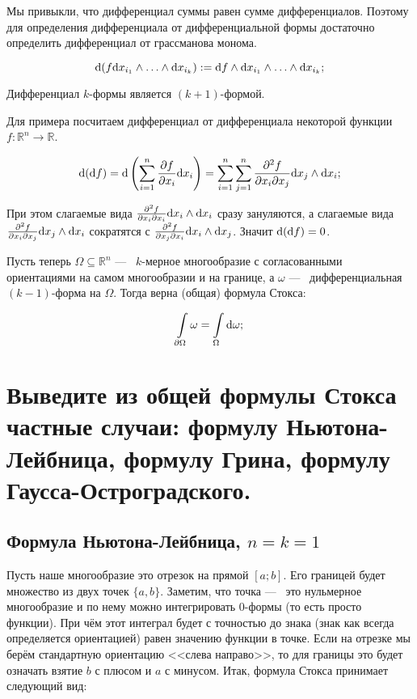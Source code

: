 \documentclass{article}
\begin{document}
	Мы привыкли, что дифференциал суммы равен сумме дифференциалов. Поэтому для определения дифференциала от дифференциальной формы достаточно определить дифференциал от грассманова монома.

	\[ \mathrm{d}(f \mathrm{d} x_{i_1} \land \ldots \land \mathrm{d} x_{i_k}) := \mathrm{d} f \land \mathrm{d} x_{i_1} \land \ldots \land \mathrm{d} x_{i_k}; \]

	\begin{remark}
		Дифференциал $k$-формы является $(k + 1)$-формой.
	\end{remark}

	Для примера посчитаем дифференциал от дифференциала некоторой функции $f:\mathbb{R}^n \to \mathbb{R}$.

	\[\mathrm{d} (\mathrm{d} f) = \mathrm{d} \left(\sum_{i = 1}^n \frac{\partial f}{\partial x_i}\mathrm{d} x_i \right) = \sum_{i = 1}^n \sum_{j = 1}^n \frac{\partial^2 f}{\partial x_i \partial x_j} \mathrm{d} x_j \land \mathrm{d} x_i; \]

	При этом слагаемые вида $\frac{\partial^2 f}{\partial x_i \partial x_i} \mathrm{d} x_i \land \mathrm{d} x_i$ сразу зануляются, а слагаемые вида $\frac{\partial^2 f}{\partial x_i \partial x_j} \mathrm{d} x_j \land \mathrm{d} x_i$ сократятся с $\frac{\partial^2 f}{\partial x_j \partial x_i} \mathrm{d} x_i \land \mathrm{d} x_j$. Значит $\mathrm{d}(\mathrm{d} f) = 0$.

	Пусть теперь $\Omega \subseteq \mathbb{R}^n$ ---~ $k$-мерное многообразие с согласованными ориентациями на самом многообразии и на границе, а $\omega$ ---~ дифференциальная $(k - 1)$-форма на $\Omega$. Тогда верна (общая) формула Стокса:

	\[ \int\limits_{\partial \Omega} \omega = \int\limits_\Omega \mathrm{d} \omega; \] 

	\section{Выведите из общей формулы Стокса частные случаи: формулу Ньютона-Лейбница, формулу Грина, формулу Гаусса-Остроградского.}

	\subsection*{Формула Ньютона-Лейбница, $n = k = 1$}

	Пусть наше многообразие это отрезок на прямой $[a; b]$. Его границей будет множество из двух точек $\{a, b\}$. Заметим, что точка ---~ это нульмерное многообразие и по нему можно интегрировать 0-формы (то есть просто функции). При чём этот интеграл будет с точностью до знака (знак как всегда определяется ориентацией) равен значению функции в точке. Если на отрезке мы берём стандартную ориентацию <<слева направо>>, то для границы это будет означать взятие $b$ с плюсом и $a$ с минусом. Итак, формула Стокса принимает следующий вид:
	
\end{document}
